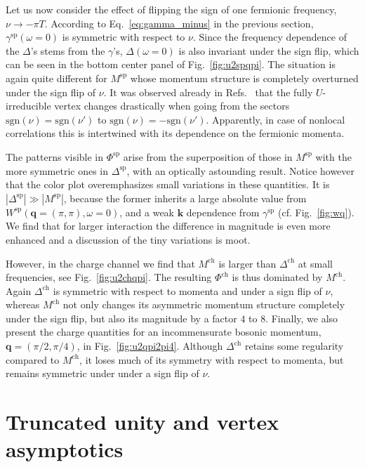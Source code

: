 \documentclass[epj]{svjour}
\newcommand{\kv}{\ensuremath{\mathbf{k}}}
\newcommand{\qv}{\ensuremath{\mathbf{q}}}
\newcommand{\ch}{\ensuremath{\text{ch}}}
\newcommand{\sz}{\ensuremath{\text{sp}}}
\begin{document}
Let us now consider the effect of flipping the sign of one fermionic frequency, $\nu\rightarrow-\pi T$.
According to Eq.~\eqref{eq:gamma_minus} in the previous section, $\gamma^\sz(\omega=0)$ is symmetric
with respect to $\nu$. Since the frequency dependence of the
$\Delta$'s stems from the $\gamma$'s, $\Delta(\omega=0)$ is also invariant under the sign flip,
which can be seen in the bottom center panel of Fig.~\ref{fig:u2spqpi}.
The situation is again quite different for $M^\sz$ whose momentum structure is completely overturned
under the sign flip of $\nu$. It was observed already in Refs.~\cite{Krien19-2,Harkov21} that
the fully $U$-irreducible vertex changes drastically when going from the sectors
$\text{sgn}(\nu)=\text{sgn}(\nu')$ to $\text{sgn}(\nu)=-\text{sgn}(\nu')$.
Apparently, in case of nonlocal correlations this is intertwined with its dependence on the fermionic momenta.

The patterns visible in $\Phi^\sz$ arise from the superposition of those in $M^\sz$ with
the more symmetric ones in $\Delta^\sz$, with an optically astounding result.
Notice however that the color plot overemphasizes small variations in these quantities.
It is $|\Delta^\sz|\gg|M^\sz|$, because the former inherits a large absolute value from
$W^\sz(\qv=(\pi,\pi),\omega=0)$, and a weak $\kv$ dependence from $\gamma^\sz$ (cf. Fig.~\ref{fig:wq}).
We find that for larger interaction the difference in magnitude is even more enhanced
and a discussion of the tiny variations is moot.

However, in the charge channel we find that $M^\ch$ is larger than $\Delta^\ch$ at small frequencies, see Fig.~\ref{fig:u2chqpi}. 
The resulting $\Phi^\ch$ is thus dominated by $M^\ch$.
Again $\Delta^\ch$ is symmetric with respect to momenta
and under a sign flip of $\nu$, whereas $M^\ch$ not only changes its asymmetric momentum structure
completely under the sign flip, but also its magnitude by a factor $4$ to $8$.
Finally, we also present the charge quantities for an incommensurate bosonic momentum,
$\qv=(\pi/2,\pi/4)$, in Fig.~\ref{fig:u2qpi2pi4}.
Although $\Delta^\ch$ retains some regularity compared to $M^\ch$,
it loses much of its symmetry with respect to momenta, but remains symmetric under under a sign flip of $\nu$.

\section{Truncated unity and vertex asymptotics}\label{sec:tu}
\end{document}
